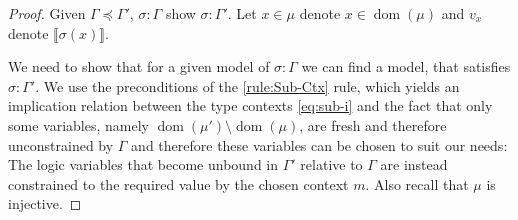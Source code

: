\documentclass[twoside, english]{sdqthesis}
\newcommand{\bbracket}[1]{\llbracket #1 \rrbracket}
\DeclareMathOperator{\dom}{dom}
\theoremstyle{definition}
\begin{document}
\begin{proof}
  Given $\Gamma \preceq \Gamma'$, $\sigma : \Gamma$ show $\sigma : \Gamma'$. Let $x \in \mu$ denote $x \in \dom(\mu)$ and $v_x$ denote $\bbracket{\sigma(x)}$.

  We need to show that for a given model of $\sigma : \Gamma$ we can find a model, that satisfies $\sigma : \Gamma'$. We use the preconditions of the \ref{rule:Sub-Ctx} rule, which yields an implication relation between the type contexts \eqref{eq:sub-i} and the fact that only some variables, namely $\dom(\mu') \setminus \dom(\mu)$, are fresh and therefore unconstrained by $\Gamma$ and therefore these variables can be chosen to suit our needs: The logic variables that become unbound in $\Gamma'$ relative to $\Gamma$ are instead constrained to the required value by the chosen context $m$. 
  Also recall that $\mu$ is injective.


\end{proof}
\end{document}
